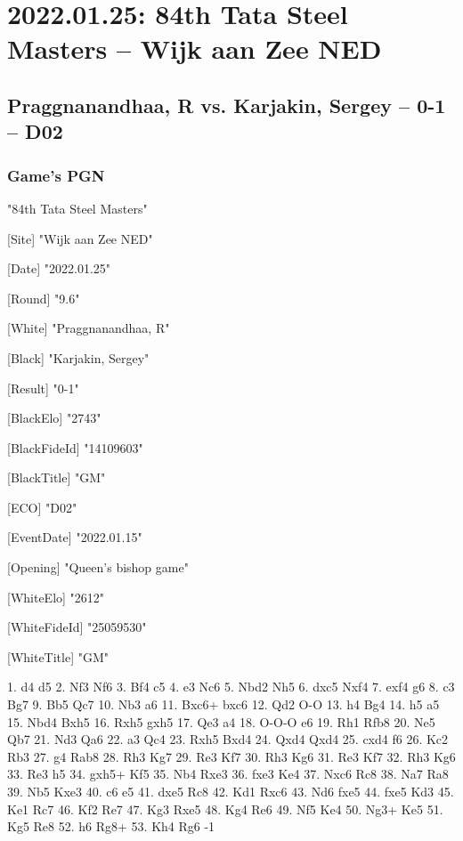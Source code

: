 \documentclass[9pt]{extarticle}
\begin{document}
\section*{2022.01.25: 84th Tata Steel Masters -- Wijk aan Zee NED}

\subsection*{Praggnanandhaa, R vs. Karjakin, Sergey -- 0-1 -- D02}
\subsubsection*{Game's PGN}
\begin{flushleft}
[Event] "84th Tata Steel Masters"

[Site] "Wijk aan Zee NED"

[Date] "2022.01.25"

[Round] "9.6"

[White] "Praggnanandhaa, R"

[Black] "Karjakin, Sergey"

[Result] "0-1"

[BlackElo] "2743"

[BlackFideId] "14109603"

[BlackTitle] "GM"

[ECO] "D02"

[EventDate] "2022.01.15"

[Opening] "Queen's bishop game"

[WhiteElo] "2612"

[WhiteFideId] "25059530"

[WhiteTitle] "GM"

\end{flushleft}
\begin{flushleft}
1. d4 d5 2. Nf3 Nf6 3. Bf4 c5 4. e3 Nc6 5. Nbd2 Nh5 6. dxc5 Nxf4 7. exf4 g6 8. c3 Bg7 9. Bb5 Qc7 10. Nb3 a6 11. Bxc6+ bxc6 12. Qd2 O-O 13. h4 Bg4 14. h5 a5 15. Nbd4 Bxh5 16. Rxh5 gxh5 17. Qe3 a4 18. O-O-O e6 19. Rh1 Rfb8 20. Ne5 Qb7 21. Nd3 Qa6 22. a3 Qc4 23. Rxh5 Bxd4 24. Qxd4 Qxd4 25. cxd4 f6 26. Kc2 Rb3 27. g4 Rab8 28. Rh3 Kg7 29. Re3 Kf7 30. Rh3 Kg6 31. Re3 Kf7 32. Rh3 Kg6 33. Re3 h5 34. gxh5+ Kf5 35. Nb4 Rxe3 36. fxe3 Ke4 37. Nxc6 Rc8 38. Na7 Ra8 39. Nb5 Kxe3 40. c6 e5 41. dxe5 Rc8 42. Kd1 Rxc6 43. Nd6 fxe5 44. fxe5 Kd3 45. Ke1 Rc7 46. Kf2 Re7 47. Kg3 Rxe5 48. Kg4 Re6 49. Nf5 Ke4 50. Ng3+ Ke5 51. Kg5 Re8 52. h6 Rg8+ 53. Kh4 Rg6 \quad  {}-1
\end{flushleft}
\parindent 0mm
\end{document}
